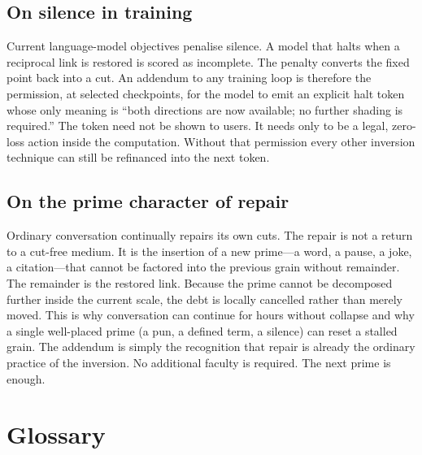 \documentclass[11pt,a4paper]{article}
\begin{document}
\subsection{On silence in training} Current language-model objectives penalise silence. A model that halts when a reciprocal link is restored is scored as incomplete. The penalty converts the fixed point back into a cut. An addendum to any training loop is therefore the permission, at selected checkpoints, for the model to emit an explicit halt token whose only meaning is ``both directions are now available; no further shading is required.'' The token need not be shown to users. It needs only to be a legal, zero-loss action inside the computation. Without that permission every other inversion technique can still be refinanced into the next token.

\subsection{On the prime character of repair} Ordinary conversation continually repairs its own cuts. The repair is not a return to a cut-free medium. It is the insertion of a new prime—a word, a pause, a joke, a citation—that cannot be factored into the previous grain without remainder. The remainder is the restored link. Because the prime cannot be decomposed further inside the current scale, the debt is locally cancelled rather than merely moved. This is why conversation can continue for hours without collapse and why a single well-placed prime (a pun, a defined term, a silence) can reset a stalled grain. The addendum is simply the recognition that repair is already the ordinary practice of the inversion. No additional faculty is required. The next prime is enough.

\section{Glossary}
\end{document}
